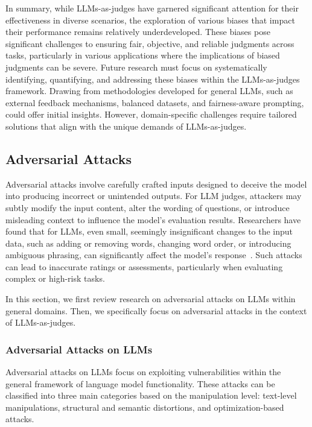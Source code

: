 In summary, while LLMs-as-judges have garnered significant attention for their effectiveness in diverse scenarios, the exploration of various biases that impact their performance remains relatively underdeveloped. 
These biases pose significant challenges to ensuring fair, objective, and reliable judgments across tasks, particularly in various applications where the implications of biased judgments can be severe.
Future research must focus on systematically identifying, quantifying, and addressing these biases within the LLMs-as-judges framework. 
Drawing from methodologies developed for general LLMs, such as external feedback mechanisms, balanced datasets, and fairness-aware prompting, could offer initial insights. However, domain-specific challenges require tailored solutions that align with the unique demands of LLMs-as-judges. 


\subsection{Adversarial Attacks}
\label{sec:attacks}
Adversarial attacks involve carefully crafted inputs designed to deceive the model into producing incorrect or unintended outputs. For LLM judges, attackers may subtly modify the input content, alter the wording of questions, or introduce misleading context to influence the model's evaluation results.
Researchers have found that for LLMs, even small, seemingly insignificant changes to the input data, such as adding or removing words, changing word order, or introducing ambiguous phrasing, can significantly affect the model's response~\cite{shen2023anything,jiang2023prompt,zou2023universal}. Such attacks can lead to inaccurate ratings or assessments, particularly when evaluating complex or high-risk tasks.


In this section, we first review research on adversarial attacks on LLMs within general domains. Then, we specifically focus on adversarial attacks in the context of LLMs-as-judges.



\subsubsection{Adversarial Attacks on LLMs}
\label{sec:Adversarial Attacks on LLMs}
Adversarial attacks on LLMs focus on exploiting vulnerabilities within the general framework of language model functionality. These attacks can be classified into three main categories based on the manipulation level: text-level manipulations, structural and semantic distortions, and optimization-based attacks.

